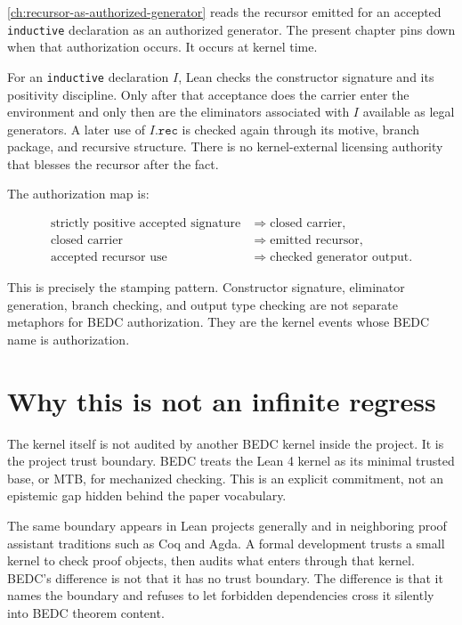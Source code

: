 \autoref{ch:recursor-as-authorized-generator} reads the recursor emitted for an
accepted \texttt{inductive} declaration as an authorized generator. The present
chapter pins down when that authorization occurs. It occurs at kernel time.

For an \texttt{inductive} declaration $I$, Lean checks the constructor
signature and its positivity discipline. Only after that acceptance does the
carrier enter the environment and only then are the eliminators associated with
$I$ available as legal generators. A later use of $I.\texttt{rec}$ is checked
again through its motive, branch package, and recursive structure. There is no
kernel-external licensing authority that blesses the recursor after the fact.

The authorization map is:

$$
\begin{aligned}
\text{strictly positive accepted signature}
&\Longrightarrow \text{closed carrier},\\
\text{closed carrier}
&\Longrightarrow \text{emitted recursor},\\
\text{accepted recursor use}
&\Longrightarrow \text{checked generator output}.
\end{aligned}
$$

This is precisely the \NameCert{} stamping pattern. Constructor signature,
eliminator generation, branch checking, and output type checking are not
separate metaphors for BEDC authorization. They are the kernel events whose
BEDC name is authorization.

\section{Why this is not an infinite regress}
\label{sec:kernel-audit-witness-not-regress}

The kernel itself is not audited by another BEDC kernel inside the project. It
is the project trust boundary. BEDC treats the Lean 4 kernel as its minimal
trusted base, or MTB, for mechanized checking. This is an explicit commitment,
not an epistemic gap hidden behind the paper vocabulary.

The same boundary appears in Lean projects generally and in neighboring proof
assistant traditions such as Coq and Agda. A formal development trusts a small
kernel to check proof objects, then audits what enters through that kernel.
BEDC's difference is not that it has no trust boundary. The difference is that
it names the boundary and refuses to let forbidden dependencies cross it
silently into BEDC theorem content.

